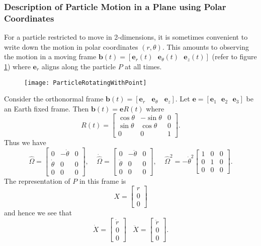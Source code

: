 \documentclass[graybox,envcountchap,sectrefs]{svmonoMuga}
\begin{document}
\subsubsection{Description of Particle Motion in a Plane using Polar Coordinates}\label{Secn:PolarCoords}
For a particle restricted to move in 2-dimensions, it is sometimes convenient to write down the motion in polar coordinates $(r,\theta)$. This amounts to 
observing the motion in a moving frame  $\mathbf{b}(t)=[\mathbf{e}_r(t)\:\:\: \mathbf{e}_{\theta}(t)\:\:\: \mathbf{e}_{z}(t)]$ (refer to figure \ref{Fig:RotatingFrameWithBody}) where
$\mathbf{e}_r$ aligns along the particle $P$ at all times.  \begin{figure}[ht]
\begin{center}
\texttt{[image: ParticleRotatingWithPoint]}
\renewcommand{\baselinestretch}{1}\selectfont
\caption{}
\label{Fig:RotatingFrameWithBody}
\renewcommand{\baselinestretch}{1.5}\selectfont
\end{center}
\end{figure}
Consider the orthonormal frame $\mathbf{b}(t)=[\mathbf{e}_r\:\:\:\:\mathbf{e}_{\theta}\:\:\:\:\mathbf{e}_{z}]$. 
Let $\mathbf{e}=[\mathbf{e}_1\:\:\:\mathbf{e}_2\:\:\:\mathbf{e}_3]$ be an Earth fixed frame. Then $\mathbf{b}(t)=\mathbf{e}R(t)$ where
\[
R(t)=\left[\begin{array}{ccc}\cos{\theta} & -\sin{\theta} & 0\\
\sin{\theta} & \cos{\theta} & 0\\
0 & 0 & 1
\end{array}\right].
\]
Thus we have
\[
\widehat{\Omega}=\begin{bmatrix}0 & -\dot{\theta} &0\\
\dot{\theta} & 0 & 0\\
0 & 0 &0\end{bmatrix},\:\:\:\:\:
\dot{\widehat{\Omega}}=\begin{bmatrix}0 & -\ddot{\theta} &0\\
\ddot{\theta} & 0 & 0\\
0 & 0 &0\end{bmatrix},\:\:\:\:\:\widehat{\Omega}^2=-\dot{\theta}^2\begin{bmatrix}1 & 0 &0\\
0 & 1 & 0\\
0 & 0 &0\end{bmatrix}.
\]
The representation of $P$ in this frame is
\[
X=\left[\begin{array}{c} r\\ 0 \\ 0
\end{array} \right]
\]
and hence we see that
\[
\dot{X}=\left[\begin{array}{c} \dot{r}\\
0 \\ 0 \end{array} \right]\:\:\:\:\ddot{X}=\left[\begin{array}{c} \ddot{r}\\
0 \\ 0 \end{array} \right].
\]
\end{document}

